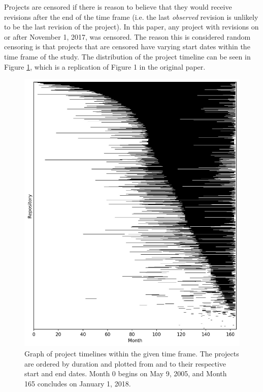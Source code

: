 \documentclass[acmconf]{acmart}
\begin{document}
Projects are censored if there is reason to believe that they would receive revisions after the end of the time frame (i.e. the last \emph{observed} revision is unlikely to be the last revision of the project).
In this paper, any project with revisions on or after November 1, 2017, was censored. 
The reason this is considered random censoring is that projects that are censored have varying start dates within the time frame of the study.
The distribution of the project timeline can be seen in Figure \ref{fig:figure-1}, which is a replication of Figure 1 in the original paper.

\begin{figure}[ht]
\centering
\includegraphics[scale=0.5]{figure1.jpg}
\caption{Graph of project timelines within the given time frame. The projects are ordered by duration and plotted from and to their respective start and end dates. Month 0 begins on May 9, 2005, and Month 165 concludes on January 1, 2018.}
\label{fig:figure-1}
\end{figure}
\end{document}
